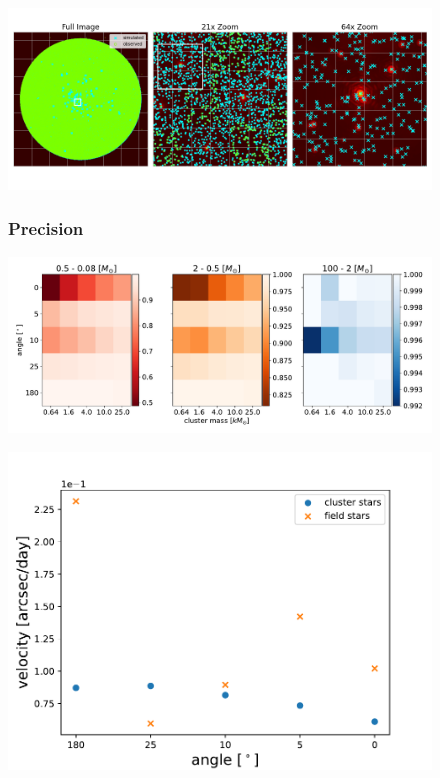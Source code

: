\documentclass{beamer}
\begin{document}
\begin{frame}
\begin{figure}
\centering
\includegraphics[width=\textwidth,height=\textheight,keepaspectratio]{Images/fits_sim_obs.png}
\end{figure}
\end{frame}

\begin{frame}
\begin{figure}
\centering
\frametitle{Precision}
\includegraphics[width=\textwidth,height=\textheight,keepaspectratio]{Images/25_precision.pdf}
\end{figure}
\end{frame}

\begin{frame}
\begin{figure}
\centering
\includegraphics[width=\textwidth,height=\textheight,keepaspectratio]{Images/25_avg_vel_640.pdf}
\end{figure}
\end{frame}
\end{document}

